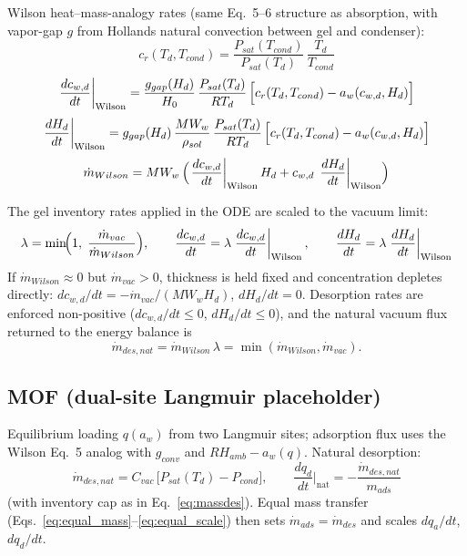 \documentclass[11pt]{article}
\begin{document}
Wilson heat--mass-analogy rates (same Eq.~5--6 structure as absorption, with vapor-gap $g$ from Hollands natural convection between gel and condenser):
\begin{equation}
c_r(T_d, T_{cond}) = \frac{P_{sat}(T_{cond})}{P_{sat}(T_d)}\,\frac{T_d}{T_{cond}}
\label{eq:crdes}
\end{equation}
\begin{equation}
\left.\frac{dc_{w,d}}{dt}\right|_{\mathrm{Wilson}}
= \frac{g_{gap}(H_d)}{H_0}\,\frac{P_{sat}(T_d)}{RT_d}\,
\Bigl[c_r(T_d, T_{cond}) - a_w(c_{w,d}, H_d)\Bigr]
\label{eq:massdes_cw}
\end{equation}
\begin{equation}
\left.\frac{dH_d}{dt}\right|_{\mathrm{Wilson}}
= g_{gap}(H_d)\,\frac{MW_w}{\rho_{sol}}\,\frac{P_{sat}(T_d)}{RT_d}\,
\Bigl[c_r(T_d, T_{cond}) - a_w(c_{w,d}, H_d)\Bigr]
\label{eq:massdes_H}
\end{equation}
\begin{equation}
\dot{m}_{Wilson} = MW_w\,\Bigl(
\left.\frac{dc_{w,d}}{dt}\right|_{\mathrm{Wilson}} H_d
+ c_{w,d}\,\left.\frac{dH_d}{dt}\right|_{\mathrm{Wilson}}\Bigr)
\label{eq:mwilson}
\end{equation}

The gel inventory rates applied in the ODE are scaled to the vacuum limit:
\begin{equation}
\lambda = \min\!\Bigl(1,\; \frac{\dot{m}_{vac}}{\dot{m}_{Wilson}}\Bigr),
\qquad
\frac{dc_{w,d}}{dt} = \lambda\left.\frac{dc_{w,d}}{dt}\right|_{\mathrm{Wilson}},
\qquad
\frac{dH_d}{dt} = \lambda\left.\frac{dH_d}{dt}\right|_{\mathrm{Wilson}}
\label{eq:massdes_scale}
\end{equation}
If $\dot{m}_{Wilson} \approx 0$ but $\dot{m}_{vac} > 0$, thickness is held fixed and concentration depletes directly:
$dc_{w,d}/dt = -\dot{m}_{vac}/(MW_w H_d)$, $dH_d/dt = 0$.
Desorption rates are enforced non-positive ($dc_{w,d}/dt \le 0$, $dH_d/dt \le 0$), and the natural vacuum flux returned to the energy balance is
\begin{equation}
\dot{m}_{des,nat} = \dot{m}_{Wilson}\,\lambda = \min(\dot{m}_{Wilson}, \dot{m}_{vac}).
\label{eq:mdesnat}
\end{equation}

\subsection{MOF (dual-site Langmuir placeholder)}

Equilibrium loading $q(a_w)$ from two Langmuir sites; adsorption flux uses the Wilson Eq.~5 analog with $g_{conv}$ and $RH_{amb} - a_w(q)$. Natural desorption:
\begin{equation}
\dot{m}_{des,nat} = C_{vac}\,\bigl[P_{sat}(T_d) - P_{cond}\bigr],
\qquad
\frac{dq_d}{dt}\Big|_{\mathrm{nat}} = -\frac{\dot{m}_{des,nat}}{m_{ads}}
\end{equation}
(with inventory cap as in Eq.~\eqref{eq:massdes}). Equal mass transfer (Eqs.~\eqref{eq:equal_mass}--\eqref{eq:equal_scale}) then sets $\dot{m}_{ads}=\dot{m}_{des}$ and scales $dq_a/dt$, $dq_d/dt$.
\end{document}

